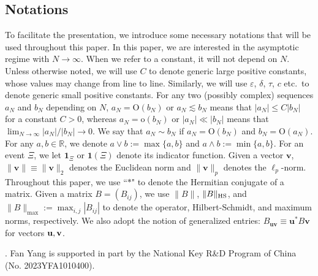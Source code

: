 \documentclass[10pt,reqno]{amsart}
\numberwithin{equation}{section}
\numberwithin{figure}{section}
\theoremstyle{plain} %
\theoremstyle{definition} %
\renewcommand{\txt}[1]{\text{\rm{#1}}}
\newcommand{\R}{\mathbb{R}}
\newcommand{\N}{\mathbb{N}}
\newcommand{\Z}{\mathbb{Z}}
\renewcommand{\epsilon}{\varepsilon}
\newcommand{\bu}{{\bf{u}}}
\newcommand{\bv}{{\bf{v}}}
\newcommand{\oo}{\mathrm{o}}
\newcommand{\OO}{\mathrm{O}}
\newcommand{\HS}{\txt{HS}}
\numberwithin{equation}{section}
\begin{document}



\subsection*{Notations} 
To facilitate the presentation, we introduce some necessary notations that will be used throughout this paper. In this paper, we are interested in the asymptotic regime with $N\to \infty$. When we refer to a constant, it will not depend on $N$. Unless otherwise noted, we will use $C$ to denote generic large positive constants, whose values may change from line to line. Similarly, we will use $\epsilon$, $\delta$, $\tau$, $c$ etc.~to denote generic small positive constants. 
For any two (possibly complex) sequences $a_N$ and $b_N$ depending on $N$, $a_N = \OO(b_N)$ or $a_N \lesssim b_N$ means that $|a_N| \le C|b_N|$ for a constant $C>0$, whereas $a_N=\oo(b_N)$ or $|a_N|\ll |b_N|$ means that $\lim_{N\to \infty}|a_N| /|b_N| \to 0$. We say that $a_N\sim b_N$ if $a_N = \OO(b_N)$ and $b_N = \OO(a_N)$. For any $a,b\in\R$, we denote %
$a\vee b:=\max\{a, b\}$ and $a\wedge b:=\min\{a, b\}$. 
For an event $\Xi$, we let $\mathbf 1_\Xi$ or $\mathbf 1(\Xi)$ denote its indicator function. 
Given a vector $\mathbf v$, $\|\mathbf v\|\equiv \|\mathbf v\|_2$ denotes the Euclidean norm and $\|\mathbf v\|_p$ denotes the $\ell_p$-norm. 
Throughout this paper, we use ``$*$" to denote the Hermitian conjugate of a matrix.
Given a matrix $B = (B_{ij})$, we use $\|B\|$, $\|B\|_{\HS}$, and $\|B\|_{\max}:=\max_{i,j}|B_{ij}|$ to denote the operator, Hilbert-Schmidt, and maximum norms, respectively. We also adopt the notion of generalized entries: $B_\mathbf{uv}\equiv \mathbf u^* B \mathbf v$ for vectors $\bu,\bv$.

\medskip
{}.   
Fan Yang is supported in part by the National Key R\&D Program of China (No. 2023YFA1010400). %
\end{document}
